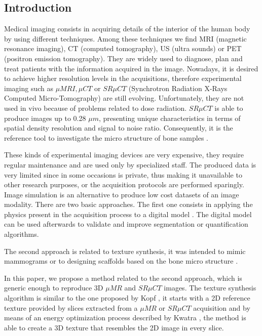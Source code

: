 \subsection{Introduction}
\label{sec:intro}

Medical imaging consists in acquiring details of the interior of the human body by using different techniques. 
Among these techniques we find MRI (magnetic resonance imaging), CT (computed tomography),
US (ultra sounds) or PET (positron emission tomography). They are widely used to diagnose, plan and treat patients with the information acquired in the image.
Nowadays, it is desired to achieve higher resolution levels in the acquisitions,
therefore experimental imaging such as $\mu{MRI}, \mu{CT}$ or $SR \mu{CT}$ (Synchrotron Radiation X-Rays Computed Micro-Tomography) 
are still evolving. Unfortunately, they are not used in vivo because of problems related to dose radiation.
$SR \mu{CT}$ is able to produce images up to 0.28 $\mu{m}$, presenting
unique characteristics in terms of spatial density resolution and signal to noise ratio.
Consequently, it is the reference tool to investigate the micro structure of bone samples \cite{revol2002}.

These kinds of experimental imaging devices are very expensive, they require regular maintenance and are used only by specialized staff. 
The produced data is very limited since in some occasions is private, thus making it unavailable to other research purposes, 
or the acquisition protocols are performed sparingly. Image simulation is an alternative to produce low cost datasets of an image modality. 
There are two basic approaches. The first one consists in 
applying the physics present in the acquisition process to a digital model \cite{CHAR-09}.
The digital model can be used afterwards to validate and improve segmentation or quantification algorithms.

The second approach is related to texture synthesis, it was intended to mimic mammograms \cite{Castella:08} or
to designing scaffolds based on the bone micro structure \cite{DBLP:conf/smi/HoldsteinFPB09}. %

In this paper, we propose a method related to the second approach, which is generic enough to reproduce 3D $\mu{MR}$ and $SR \mu{CT}$ images. 
The texture synthesis algorithm is similar to the one proposed by Kopf \cite{KFCODLW07}, it starts with a 2D reference texture
provided by slices extracted from a $\mu{MR}$ or $SR \mu{CT}$ acquisition and by means of an energy optimization process 
described by Kwatra \cite{kwatra:2005:SIGGRAPH}, the method is able to create a 3D texture that resembles the 2D image in every slice.

